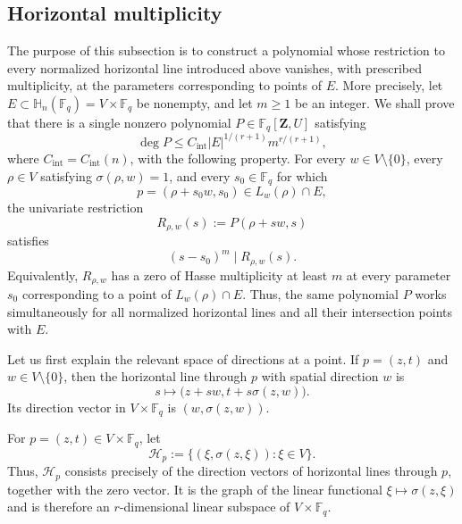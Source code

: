 \documentclass[11pt,letterpaper]{amsart}
\numberwithin{equation}{section}
\theoremstyle{definition}
\theoremstyle{remark}
\newcommand{\Fq}{\mathbb F_q}
\newcommand{\HH}{\mathbb H}
\begin{document}
\subsection{Horizontal multiplicity}
The purpose of this subsection is to construct a polynomial whose
restriction to every normalized horizontal line introduced above vanishes, with prescribed multiplicity, at the parameters corresponding to points of $E$. More precisely, let $E\subset\HH_n(\Fq)=V\times\Fq$ be nonempty, and let $m\geq1$ be an integer. We shall prove that there is a single nonzero polynomial $P\in\Fq[\mathbf Z,U]$ satisfying
\begin{equation}\label{eq:horizontal-multiplicity-overview-degree}
 \deg P
 \leq
 C_{\mathrm{int}}|E|^{1/(r+1)}m^{r/(r+1)},
\end{equation}
where $C_{\mathrm{int}}=C_{\mathrm{int}}(n)$, with the following property.
For every $w\in V\setminus\{0\}$, every $\rho\in V$ satisfying
$\sigma(\rho,w)=1$, and every $s_0\in\Fq$ for which
\[
 p=(\rho+s_0w,s_0)\in L_w(\rho)\cap E,
\]
the univariate restriction
\[
 R_{\rho,w}(s):=P(\rho+sw,s)
\]
satisfies
\begin{equation}\label{eq:horizontal-multiplicity-overview-root}
 (s-s_0)^m\mid R_{\rho,w}(s).
\end{equation}
Equivalently, $R_{\rho,w}$ has a zero of Hasse multiplicity at least $m$
at every parameter $s_0$ corresponding to a point of $L_w(\rho)\cap E$. Thus, the same polynomial $P$ works simultaneously for all normalized horizontal lines and all their intersection points with $E$.



Let us first explain the relevant space of directions at a point.  If
$p=(z,t)$ and $w\in V\setminus\{0\}$, then the horizontal line through $p$ with spatial direction $w$ is
\[
 s\longmapsto\bigl(z+sw,t+s\sigma(z,w)\bigr).
\]
Its direction vector in $V\times\Fq$ is $(w,\sigma(z,w))$.


For $p=(z,t)\in V\times\Fq$, let
\begin{equation}\label{eq:horizontal-tangent-space}
 \mathcal H_p
 :=
 \bigl\{(\xi,\sigma(z,\xi)):\xi\in V\bigr\}.
\end{equation}
Thus, $\mathcal H_p$ consists precisely of the direction vectors of
horizontal lines through $p$, together with the zero vector.  It is the graph of the linear functional $\xi\mapsto\sigma(z,\xi)$ and is therefore an $r$-dimensional linear subspace of $V\times\Fq$.
\end{document}
